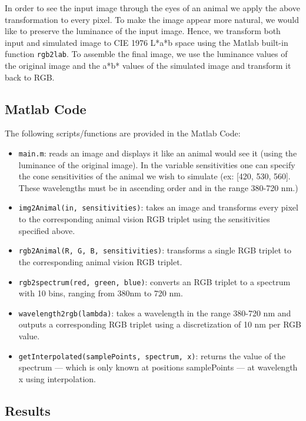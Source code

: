 \documentclass[12pt]{article}
\begin{document}
\vspace{5mm}

In order to see the input image through the eyes of an animal we apply the above transformation to every
pixel. To make the image appear more natural, we would like to preserve the luminance of the input image.
Hence, we transform both input and simulated image to CIE 1976 L*a*b space using the Matlab built-in
function  \verb|rgb2lab|. To assemble the final image, we use the luminance values of the original image and the
a*b* values of the simulated image and transform it back to RGB.

\subsection{Matlab Code}

The following scripts/functions are provided in the Matlab Code:

\begin{itemize}
\item \verb|main.m|: reads an image and displays it like an animal would see it (using the luminance of the original
image). In the variable sensitivities one can specify the cone sensitivities of the animal we wish to
simulate (ex: [420, 530, 560]. These wavelengths must be in ascending order and in the range 380-720
nm.)
\item \verb|img2Animal(in, sensitivities)|: takes an image and transforms every pixel to the corresponding animal
vision RGB triplet using the sensitivities specified above.
\item \verb|rgb2Animal(R, G, B, sensitivities)|: transforms a single RGB triplet to the corresponding animal vision RGB
triplet.
\item \verb|rgb2spectrum(red, green, blue)|: converts an RGB triplet to a spectrum with 10 bins, ranging from 380nm
to 720 nm.
\item \verb|wavelength2rgb(lambda)|: takes a wavelength in the range 380-720 nm and outputs a corresponding
RGB triplet using a discretization of 10 nm per RGB value.
\item \verb|getInterpolated(samplePoints, spectrum, x)|: returns the value of the spectrum — which is only known at
positions samplePoints — at wavelength x using interpolation.
\end{itemize}

\subsection{Results}
\end{document}
